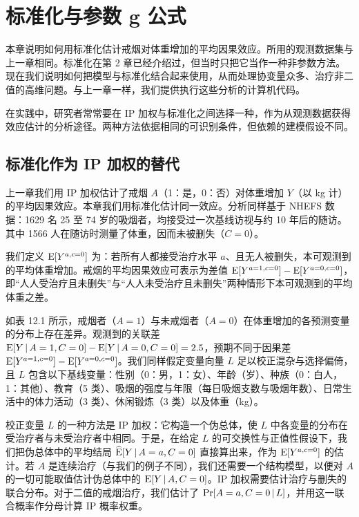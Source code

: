 \chapter[\hspace{0.6em}标准化与参数 g 公式]{标准化与参数 g 公式}

本章说明如何用标准化估计戒烟对体重增加的平均因果效应。所用的观测数据集与上一章相同。标准化在第 2 章已经介绍过，但当时只把它当作一种非参数方法。现在我们说明如何把模型与标准化结合起来使用，从而处理协变量众多、治疗非二值的高维问题。与上一章一样，我们提供执行这些分析的计算机代码。

在实践中，研究者常常要在 IP 加权与标准化之间选择一种，作为从观测数据获得效应估计的分析途径。两种方法依据相同的可识别条件，但依赖的建模假设不同。

\section{标准化作为 IP 加权的替代}

上一章我们用 IP 加权估计了戒烟 $A$（1：是，0：否）对体重增加 $Y$（以 kg 计）的平均因果效应。本章我们用标准化估计同一效应。分析同样基于 NHEFS 数据：1629 名 25 至 74 岁的吸烟者，均接受过一次基线访视与约 10 年后的随访。其中 1566 人在随访时测量了体重，因而未被删失（$C=0$）。

我们定义 $\mathrm{E}[Y^{a,c=0}]$ 为：若所有人都接受治疗水平 $a$、且无人被删失，本可观测到的平均体重增加。戒烟的平均因果效应可表示为差值 $\mathrm{E}[Y^{a=1,c=0}]-\mathrm{E}[Y^{a=0,c=0}]$，即“人人受治疗且未删失”与“人人未受治疗且未删失”两种情形下本可观测到的平均体重之差。

如表 12.1 所示，戒烟者（$A=1$）与未戒烟者（$A=0$）在体重增加的各预测变量的分布上存在差异。观测到的关联差 $\mathrm{E}[Y\,|\, A=1,C=0]-\mathrm{E}[Y\,|\, A=0,C=0]=2.5$，预期不同于因果差 $\mathrm{E}[Y^{a=1,c=0}]-\mathrm{E}[Y^{a=0,c=0}]$。我们同样假定变量向量 $L$ 足以校正混杂与选择偏倚，且 $L$ 包含以下基线变量：性别（0：男，1：女）、年龄（岁）、种族（0：白人，1：其他）、教育（5 类）、吸烟的强度与年限（每日吸烟支数与吸烟年数）、日常生活中的体力活动（3 类）、休闲锻炼（3 类）以及体重（kg）。

校正变量 $L$ 的一种方法是 IP 加权：它构造一个伪总体，使 $L$ 中各变量的分布在受治疗者与未受治疗者中相同。于是，在给定 $L$ 的可交换性与正值性假设下，我们把伪总体中的平均结局 $\widehat{\mathrm{E}}[Y\,|\, A=a,C=0]$ 直接算出来，作为 $\mathrm{E}[Y^{a,c=0}]$ 的估计。若 $A$ 是连续治疗（与我们的例子不同），我们还需要一个结构模型，以便对 $A$ 的一切可能取值估计伪总体中的 $\mathrm{E}[Y\,|\, A,C=0]$。IP 加权需要估计治疗与删失的联合分布。对于二值的戒烟治疗，我们估计了 $\Pr[A=a,C=0\,|\, L]$，并用这一联合概率作分母计算 IP 概率权重。

